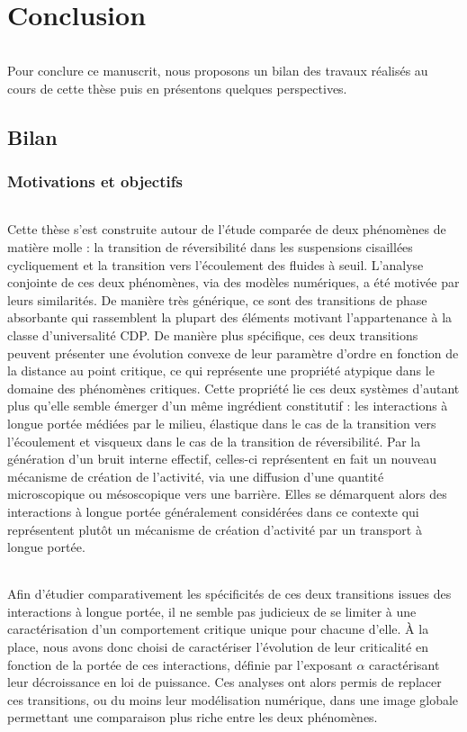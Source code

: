 \chapter*{Conclusion}
\label{chapter:conclusion}

\subparagraph{}Pour conclure ce manuscrit, nous proposons un bilan des travaux réalisés au cours de cette thèse puis en présentons quelques perspectives.

\section*{Bilan}

\subsection*{Motivations et objectifs}

\subparagraph{}Cette thèse s'est construite autour de l'étude comparée de deux phénomènes de matière molle : la transition de réversibilité dans les suspensions cisaillées cycliquement et la transition vers l'écoulement des fluides à seuil. L'analyse conjointe de ces deux phénomènes, via des modèles numériques, a été motivée par leurs similarités. De manière très générique, ce sont des transitions de phase absorbante qui rassemblent la plupart des éléments motivant l'appartenance à la classe d'universalité CDP. De manière plus spécifique, ces deux transitions peuvent présenter une évolution convexe de leur paramètre d'ordre en fonction de la distance au point critique, ce qui représente une propriété atypique dans le domaine des phénomènes critiques. Cette propriété lie ces deux systèmes d'autant plus qu'elle semble émerger d'un même ingrédient constitutif : les interactions à longue portée médiées par le milieu, élastique dans le cas de la transition vers l'écoulement et visqueux dans le cas de la transition de réversibilité. Par la génération d'un bruit interne effectif, celles-ci représentent en fait un nouveau mécanisme de création de l'activité, via une diffusion d'une quantité microscopique ou mésoscopique vers une barrière. Elles se démarquent alors des interactions à longue portée généralement considérées dans ce contexte qui représentent plutôt un mécanisme de création d'activité par un transport à longue portée.

\subparagraph{}Afin d'étudier comparativement les spécificités de ces deux transitions issues des interactions à longue portée, il ne semble pas judicieux de se limiter à une caractérisation d'un comportement critique unique pour chacune d'elle. \`A la place, nous avons donc choisi de caractériser l'évolution de leur criticalité en fonction de la portée de ces interactions, définie par l'exposant $\alpha$ caractérisant leur décroissance en loi de puissance. Ces analyses ont alors permis de replacer ces transitions, ou du moins leur modélisation numérique, dans une image globale permettant une comparaison plus riche entre les deux phénomènes.

